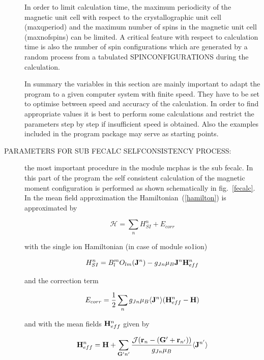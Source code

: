 \begin{description}
In order to limit calculation time, the maximum periodicity
of the magnetic unit cell with respect to the crystallographic unit cell 
(maxqperiod) and the maximum number of spins in the magnetic unit cell 
(maxnofspins) can be limited.
A critical feature with respect to calculation time is also the number of
spin configurations which are generated by a random process from a tabulated
SPINCONFIGURATIONS during the calculation. 

In summary the variables in this section are mainly important to adapt the
program to a given computer system with finite speed. They have to be set
to optimise between speed and accuracy of the calculation. In order to
find appropriate values it is best to perform some calculations 
and restrict the parameters step by step if insufficient speed is obtained.
Also the examples included in the program package may serve as starting
points.

\item [PARAMETERS FOR SUB FECALC SELFCONSISTENCY PROCESS:] the most important
procedure in the module {\prg mcphas} is the sub fecalc. In this part of the 
program the self consistent calculation of the magnetic moment configuration
is performed as shown schematically in fig.~\ref{fecalc}. 
In the mean field approximation the Hamiltonian~(\ref{hamilton}) is approximated
by

\begin{equation}
 {\mathcal H}=\sum_n H_{SI}^n + E_{corr}
\end{equation}

with the single ion Hamiltonian (in case of module {\prg so1ion})

\begin{equation}
H_{SI}^n=  B_l^m O_{lm}({\mathbf J}^n) 
	     - g_{Jn} \mu_B {\mathbf J}^n {\mathbf H^n_{eff}} 
\end{equation}

and the correction term

\begin{equation}
E_{corr}=\frac{1}{2}\sum_{n} g_{Jn} \mu_B \langle {\mathbf J}^n
 \rangle (\mathbf H^n_{eff}-\mathbf H) 
\end{equation}

and with the mean fields $ \mathbf H^n_{eff}$ given by

\begin{equation}\label{meanfield}
\mathbf H^n_{eff}=\mathbf H+\sum_{{\mathbf G'}n'} \frac{{\mathcal J}
(\mathbf r_n-(\mathbf G'+\mathbf r_{n'}))}{g_{Jn}\mu_B } \langle{\mathbf J}^{n'}\rangle
\end{equation}


\end{description}
